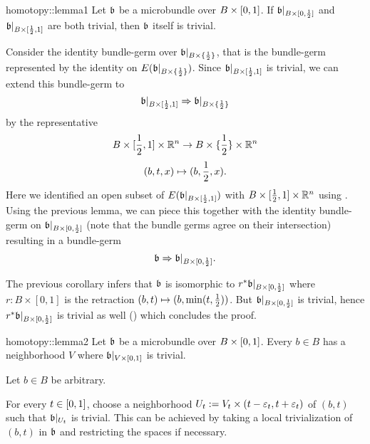 \begin{scope}
\newcommand{\A}[1][] {
    A_\alpha#1
}

\newcommand{\bbleft} {
    \bb\restr{B \times{} [0, \half]}
}
\newcommand{\bbright} {
    \bb\restr{B \times{} [\half, 1]}
}
\newcommand{\bbhalf} {
    \bb\restr{B \times{} \{ \half \}}
}

\begin{mylemma}{homotopy::lemma1}
    Let $\mathfrak{b}$ be a microbundle over $B \times [0, 1]$. If $\bbleft$ and $\bbright$ are both trivial,
    then $\mathfrak{b}$ itself is trivial.
\end{mylemma}

\begin{myproof}
    Consider the identity bundle-germ over $\bbhalf$, that is the bundle-germ represented by the identity on $E(\bbhalf)$.
    Since $\bbright$ is trivial, we can extend this bundle-germ to 
    \[ \bbright \double \bbhalf \]
    by the representative
    \[ B \times [\frac{1}{2}, 1] \times \mathbb{R}^n \to B \times \{\frac{1}{2}\} \times \mathbb{R}^n \]
    \[ (b, t, x) \mapsto (b, \frac{1}{2}, x). \]
    Here we identified an open subset of $E(\mathfrak{b}\vert_{B \times [\frac{1}{2}, 1]})$ with $B \times [\frac{1}{2}, 1] \times \mathbb{R}^n$ using .
    Using the previous lemma, we can piece this together with the identity bundle-germ on $\bbleft$ (note that the bundle germs agree on their intersection) resulting in a bundle-germ
    \[ \bb \double \bbleft. \]

    The previous corollary infers that $\mathfrak{b}$ is isomorphic to $r^*\bbleft$ where $r: B \times [0, 1]$ is the retraction $(b, t) \mapsto (b, \min(t, \frac{1}{2}))$.
    But $\bbleft$ is trivial, hence $r^*\bbleft$ is trivial as well () which concludes the proof.
\end{myproof}

\begin{mylemma}{homotopy::lemma2}
    Let $\mathfrak{b}$ be a microbundle over $B \times [0, 1]$.
    Every $b \in B$ has a neighborhood $V$ where $\mathfrak{b}\vert_{V \times [0, 1]}$ is trivial.
\end{mylemma}
\begin{myproof}
    Let $b \in B$ be arbitrary.

    For every $t \in [0, 1]$, choose a neighborhood $U_t := V_t \times (t - \varepsilon{}_t, t + \varepsilon{}_t)$ of $(b, t)$ such that $\mathfrak{b}\vert_{U_t}$ is trivial.
    This can be achieved by taking a local trivialization of $(b, t)$ in $\mathfrak{b}$ and restricting the spaces if necessary.


\end{myproof}
\end{scope}
